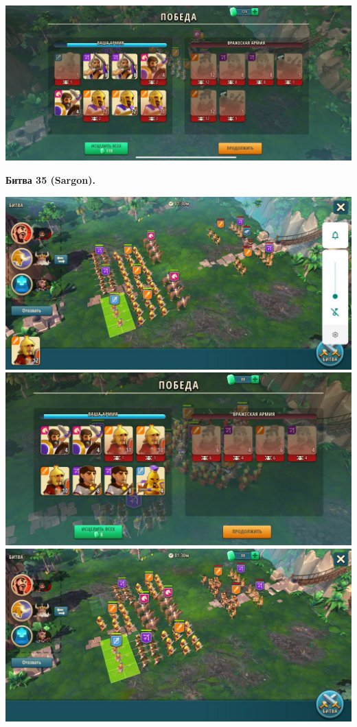 \noindent\includegraphics[width=\linewidth]{./parts/media/TreasureHunt/34/decoder/photo_2022-04-07_10-02-50.jpg} \newline

\newpage
\begin{center}
	\hypertarget{fight35}{\textbf{Битва 35 (Sargon).}}
\end{center}
\noindent\includegraphics[width=\linewidth]{./parts/media/TreasureHunt/35/sargon/photo_2022-04-07_10-08-33.jpg} \newline
\noindent\includegraphics[width=\linewidth]{./parts/media/TreasureHunt/35/sargon/photo_2022-04-07_10-08-48.jpg} \newline
\noindent\includegraphics[width=\linewidth]{./parts/media/TreasureHunt/35/sargon/photo_2022-04-07_10-08-45.jpg} \newline
